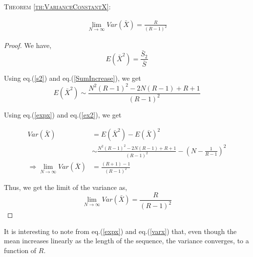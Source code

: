 \begin{multicols}{2}
\textsc{Theorem {\ref{th:VarianceConstantX}}:}

\vspace{-.7cm}

\begin{eqnarray*}
\lim_{N \rightarrow \infty} Var(\bar{X}) = \frac{R}{(R -1)^2}
\end{eqnarray*}

\vspace{-.4cm}

\begin{proof}\renewcommand{\qedsymbol}{}

We have,
\begin{equation}
E(\bar{X}^2) = \frac{\bar{S}_2}{\bar{S}}\label{eq-6.3}
\end{equation}

\vspace{-.2cm}

Using eq.(\ref{s2}) and eq.(\ref{SumIncrease}), we get
\begin{equation}
E(\bar{X}^2) \sim \frac{N^2(R-1)^2 - 2N(R-1) + R+1}{(R-1)^2}\label{eq-6.4}
\end{equation}

\vspace{-.3cm}

Using eq.(\ref{expx}) and eq.(\ref{ex2}), we get

\vspace{-.3cm}

{\fontsize{8}{9}\selectfont\begin{align*}
Var(\bar{X})&= E(\bar{X}^2)-E(\bar{X})^2\nonumber \\
&\sim \frac{N^2(R-1)^2 - 2N(R-1) + R+1}{(R-1)^2}-\left(N - \frac{1}{R-1}\right)^2\nonumber\\
\Rightarrow \lim_{N \rightarrow \infty}Var(\bar{X})& =  \frac{(R+1)-1}{(R-1)^2}\nonumber
\end{align*}}

\vspace{-.3cm}

Thus, we get the limit of the variance as,
\begin{equation}
\lim_{N \rightarrow \infty}Var(\bar{X}) = \frac{R}{(R-1)^2}\label{eq-6.5}
\end{equation}
\end{proof}

\vspace{-1cm}

It is interesting to note from eq.(\ref{expx}) and eq.(\ref{varx}) that, even though the mean increases linearly as the length of the sequence, the variance converges, to a function of $R$.


\end{multicols}
